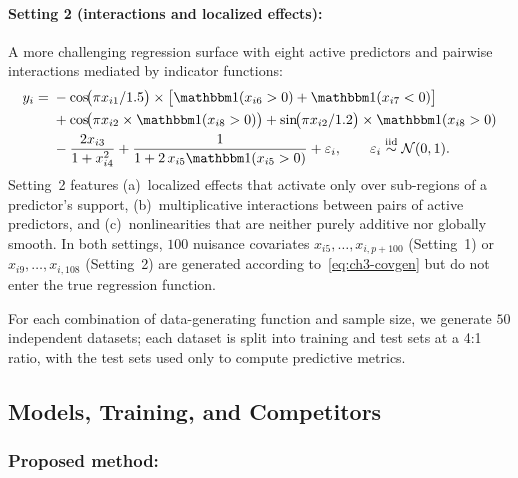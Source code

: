 \paragraph{Setting 2 (interactions and localized effects):}
A more challenging regression surface with eight active predictors
and pairwise interactions mediated by indicator functions:
\begin{equation}
  \begin{aligned}
    y_i
    ={}& -\cos\!\bigl(\pi x_{i1} / 1.5\bigr) \times
         \bigl[\ind(x_{i6} > 0) + \ind(x_{i7} < 0)\bigr] \\
    &+ \cos\!\bigl(\pi x_{i2} \times \ind(x_{i8} > 0)\bigr)
     + \sin\!\bigl(\pi x_{i2} / 1.2\bigr) \times \ind(x_{i8} > 0)  \\
    &- \frac{2 x_{i3}}{1 + x_{i4}^2}
     + \frac{1}{1 + 2\, x_{i5}\ind(x_{i5} > 0)}
     + \varepsilon_i,
    \qquad \varepsilon_i \overset{\mathrm{iid}}{\sim} \Norm(0, 1).
  \end{aligned}
  \label{eq:ch3-setting2}
\end{equation}
Setting~2 features (a)~localized effects that activate only over
sub-regions of a predictor's support, (b)~multiplicative interactions
between pairs of active predictors, and (c)~nonlinearities that are
neither purely additive nor globally smooth.  In both settings, $100$
nuisance covariates $x_{i5}, \ldots, x_{i,p+100}$
(Setting~1) or $x_{i9}, \ldots, x_{i,108}$ (Setting~2) are generated
according to~\eqref{eq:ch3-covgen} but do not enter the true regression
function.

For each combination of data-generating function and sample size, we
generate $50$ independent datasets; each dataset is split into training and test sets at a 4:1 ratio, with the test sets used only to compute predictive metrics.

\subsection{Models, Training, and Competitors}
\label{subsec:ch3-methods-comp}

\subsubsection*{Proposed method:}

